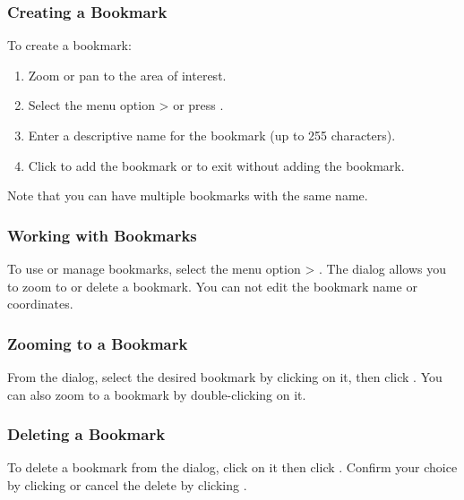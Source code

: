 \subsubsection{Creating a Bookmark}
To create a bookmark:
\begin{enumerate}
\item Zoom or pan to the area of interest.
\item Select the menu option  >  or press .
\item Enter a descriptive name for the bookmark (up to 255 characters).
\item Click  to add the bookmark or  to exit without adding the bookmark.
\end{enumerate}

Note that you can have multiple bookmarks with the same name.

\subsubsection{Working with Bookmarks}
To use or manage bookmarks, select the menu 
option  > .
The  dialog allows you to zoom to or delete a bookmark.
You can not edit the bookmark name or coordinates.

\subsubsection{Zooming to a Bookmark}
From the  dialog, select the desired bookmark by clicking on it, 
then click .
You can also zoom to a bookmark by double-clicking on it.

\subsubsection{Deleting a Bookmark}
To delete a bookmark from the  dialog, click on it then click
 .
Confirm your choice by clicking  or cancel the delete by clicking .

